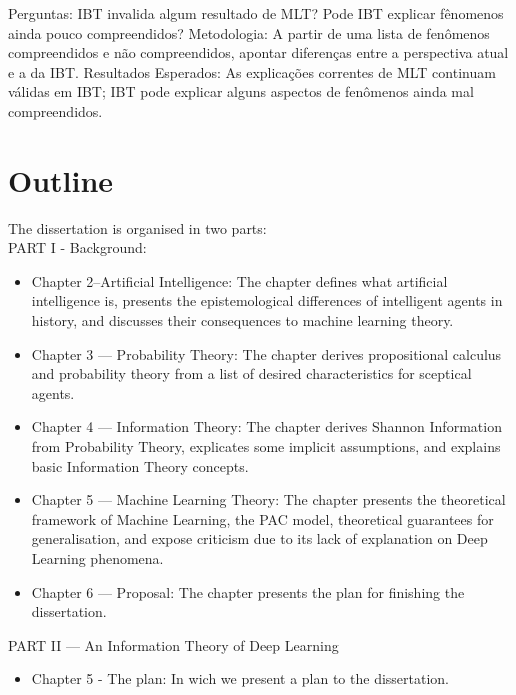 Perguntas:
IBT invalida algum resultado de MLT?
Pode IBT explicar fênomenos ainda pouco compreendidos?
Metodologia:
A partir de uma lista de fenômenos compreendidos e não compreendidos, apontar diferenças entre a perspectiva atual e a da IBT.
Resultados Esperados:
As explicações correntes de MLT continuam válidas em IBT;
IBT pode explicar alguns aspectos de fenômenos ainda mal compreendidos.



\section{Outline}

The dissertation is organised in two parts:\\
PART I - Background:
\begin{itemize}
	\item Chapter 2--Artificial Intelligence: The chapter defines what artificial intelligence is, presents the epistemological differences of intelligent agents in history, and discusses their consequences to machine learning theory.
	\item Chapter 3 --- Probability Theory: The chapter derives propositional calculus and probability theory from a list of desired characteristics for sceptical agents.
	\item Chapter 4 --- Information Theory: The chapter derives Shannon Information from Probability Theory, explicates some implicit assumptions, and explains basic Information Theory concepts.
	\item Chapter 5 --- Machine Learning Theory: The chapter presents the theoretical framework of Machine Learning, the PAC model, theoretical guarantees for generalisation, and expose criticism due to its lack of explanation on Deep Learning phenomena.
	\item Chapter 6 --- Proposal: The chapter presents the plan for finishing the dissertation.
\end{itemize}

PART II --- An Information Theory of Deep Learning
\begin{itemize}
	\item Chapter 5 - The plan: In wich we present a plan to the dissertation.
 \end{itemize}
